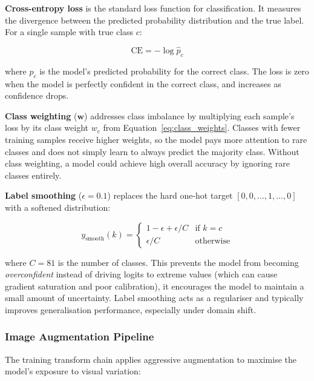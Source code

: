 \documentclass[12pt, a4paper]{article}
\begin{document}
\textbf{Cross-entropy loss} is the standard loss function for classification.
It measures the divergence between the predicted probability distribution and
the true label.  For a single sample with true class $c$:

\begin{equation}
\text{CE} = -\log \hat{p}_c
\end{equation}

where $\hat{p}_c$ is the model's predicted probability for the correct class.
The loss is zero when the model is perfectly confident in the correct class, and
increases as confidence drops.

\textbf{Class weighting} ($\mathbf{w}$) addresses class imbalance by
multiplying each sample's loss by its class weight $w_c$ from
Equation~\ref{eq:class_weights}.  Classes with fewer training samples receive
higher weights, so the model pays more attention to rare classes and does not
simply learn to always predict the majority class.  Without class weighting, a
model could achieve high overall accuracy by ignoring rare classes entirely.

\textbf{Label smoothing} ($\epsilon = 0.1$) replaces the hard one-hot target
$[0, 0, \ldots, 1, \ldots, 0]$ with a softened distribution:

\begin{equation}
y_{\text{smooth}}(k) =
\begin{cases}
1 - \epsilon + \epsilon / C & \text{if } k = c \\
\epsilon / C & \text{otherwise}
\end{cases}
\end{equation}

where $C = 81$ is the number of classes.  This prevents the model from becoming
\emph{overconfident} instead of driving logits to extreme values (which can
cause gradient saturation and poor calibration), it encourages the model to
maintain a small amount of uncertainty.  Label smoothing acts as a regulariser
and typically improves generalisation performance, especially under domain shift.

\subsubsection{Image Augmentation Pipeline}

The training transform chain applies aggressive augmentation to maximise
the model's exposure to visual variation:
\end{document}
